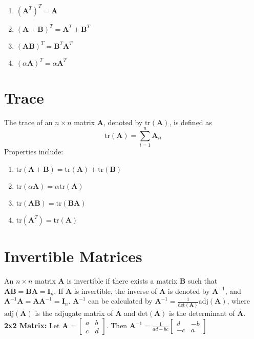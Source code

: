 \begin{enumerate}[label=(\roman*)]
	\item $(\mathbf{A}^T)^T = \mathbf{A}$
	\item $(\mathbf{A} + \mathbf{B})^T = \mathbf{A}^T + \mathbf{B}^T$
	\item $(\mathbf{AB})^T = \mathbf{B}^T \mathbf{A}^T$
	\item $(\alpha \mathbf{A})^{T} = \alpha \mathbf{A}^T$
\end{enumerate}

\section{\small Trace}
The trace of an $n \times n$ matrix $\mathbf{A}$, denoted by
$\text{tr}(\mathbf{A})$, is defined as
\[
	\text{tr}(\mathbf{A}) = \sum_{i=1}^{n} \mathbf{A}_{ii}
\]
Properties include:
\begin{enumerate}[label=(\roman*)]
	\item $\text{tr}(\mathbf{A} + \mathbf{B}) = \text{tr}(\mathbf{A}) + \text{tr}(\mathbf{B})$
	\item $\text{tr}(\alpha \mathbf{A}) = \alpha \text{tr}(\mathbf{A})$
	\item $\text{tr}(\mathbf{AB}) = \text{tr}(\mathbf{BA})$
	\item $\text{tr}(\mathbf{A}^T) = \text{tr}(\mathbf{A})$
\end{enumerate}

\section{\small Invertible Matrices}
An $n \times n$ matrix $\mathbf{A}$ is invertible if there exists a matrix
$\mathbf{B}$ such that $\mathbf{AB} = \mathbf{BA} = \mathbf{I}_n$. If
$\mathbf{A}$ is invertible, the inverse of $\mathbf{A}$ is denoted by
$\mathbf{A}^{-1}$, and $\mathbf{A}^{-1} \mathbf{A} = \mathbf{A} \mathbf{A}^{-1}
	= \mathbf{I}_n$. $\mathbf{A}^{-1}$  can be calculated by $\mathbf{A}^{-1} =
	\frac{1}{\text{det}(\mathbf{A})} \text{adj}(\mathbf{A})$, where
$\text{adj}(\mathbf{A})$ is the adjugate matrix of $\mathbf{A}$ and
$\text{det}(\mathbf{A})$ is the determinant of $\mathbf{A}$.\\
\textbf{2x2 Matrix:}
Let $\mathbf{A} = \begin{bmatrix}
		a & b \\
		c & d
	\end{bmatrix}$. Then $\mathbf{A}^{-1} = \frac{1}{ad - bc} \begin{bmatrix}
		d  & -b \\
		-c & a
	\end{bmatrix}$
